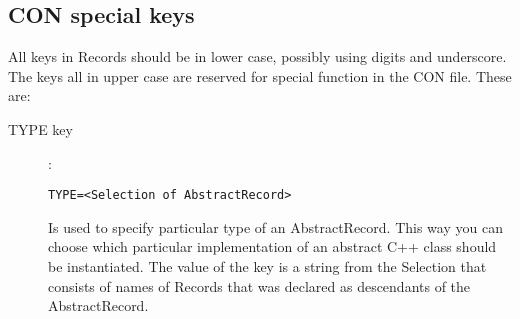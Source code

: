 \subsection{CON special keys}
All keys in Records should be in lower case, possibly using digits and underscore. The keys all in upper case are reserved for special function in the 
CON file. These are:
\begin{description}

\item[TYPE key]:
\begin{verbatim}
TYPE=<Selection of AbstractRecord>
\end{verbatim}
Is used to specify particular type of an AbstractRecord. This way you can choose which particular implementation of an abstract C++ class should be instantiated.
The value of the key is a string from the Selection that consists of names of Records that was declared as descendants of the AbstractRecord.


%




\end{description}
